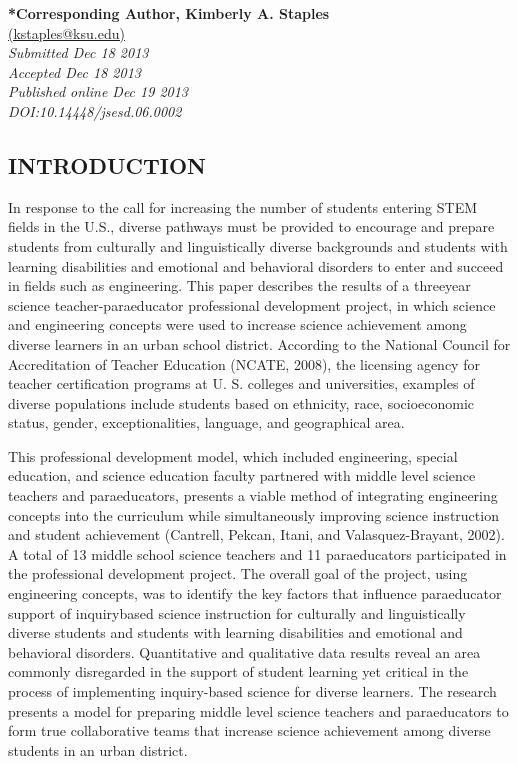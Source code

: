 \documentclass[11.5pt]{sig-alternate} %
\begin{document}

\textbf{*Corresponding Author, Kimberly A. Staples}\\
\href{mailto:  kstaples@ksu.edu}{(kstaples@ksu.edu)} \\
\textit{Submitted Dec 18 2013 }\\
\textit{Accepted Dec 18 2013} \\
\textit{Published online Dec 19 2013} \\
\textit{DOI:10.14448/jsesd.06.0002} \\
\pagebreak
\clearpage
\begin{large}
\section*{INTRODUCTION}
In response to the call for increasing the number of students entering STEM fields in the U.S., diverse pathways must be provided to encourage and prepare students from culturally and linguistically diverse backgrounds and students with learning disabilities and emotional and behavioral disorders to enter and succeed in fields such as engineering. This paper describes the results of a threeyear science teacher-paraeducator professional development project, in which science and engineering concepts were used to increase science achievement among diverse learners in an urban school district. According to the National Council for Accreditation of Teacher Education (NCATE, 2008), the licensing agency for teacher certification programs at U. S. colleges and universities, examples of diverse populations include students based on ethnicity, race, socioeconomic status, gender, exceptionalities, language, and geographical area. 

This professional development model, which included engineering, special education, and science education faculty partnered with middle level science teachers and paraeducators, presents a viable method of integrating engineering concepts into the curriculum while simultaneously improving science instruction and student achievement (Cantrell, Pekcan, Itani, and Valasquez-Brayant, 2002). A total of 13 middle school science teachers and 11 paraeducators participated in the professional development project. The overall goal of the project, using engineering concepts, was to identify the key factors that influence paraeducator support of inquirybased science instruction for culturally and linguistically diverse students and students with learning disabilities and emotional and behavioral disorders. Quantitative and qualitative data results reveal an area commonly disregarded in the support of student learning yet critical in the process of implementing inquiry-based science for diverse learners. The research presents a model for preparing middle level science teachers and paraeducators to form true collaborative teams that increase science achievement among diverse students in an urban district. 


\end{large}
\end{document}
